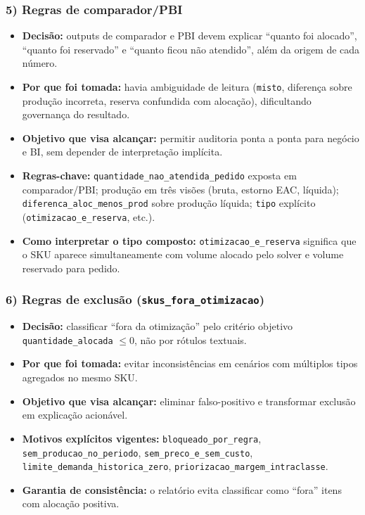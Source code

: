 \documentclass[11pt,a4paper]{article}
\begin{document}
\subsubsection*{5) Regras de comparador/PBI}
\begin{itemize}
    \item \textbf{Decisão:} outputs de comparador e PBI devem explicar ``quanto
    foi alocado'', ``quanto foi reservado'' e ``quanto ficou não atendido'',
    além da origem de cada número.
    \item \textbf{Por que foi tomada:} havia ambiguidade de leitura
    (\texttt{misto}, diferença sobre produção incorreta, reserva confundida com
    alocação), dificultando governança do resultado.
    \item \textbf{Objetivo que visa alcançar:} permitir auditoria ponta a ponta
    para negócio e BI, sem depender de interpretação implícita.
    \item \textbf{Regras-chave:}
    \texttt{quantidade\_nao\_atendida\_pedido} exposta em comparador/PBI;
    produção em três visões (bruta, estorno EAC, líquida);
    \texttt{diferenca\_aloc\_menos\_prod} sobre produção líquida;
    \texttt{tipo} explícito (\texttt{otimizacao\_e\_reserva}, etc.).
    \item \textbf{Como interpretar o tipo composto:}
    \texttt{otimizacao\_e\_reserva} significa que o SKU aparece simultaneamente
    com volume alocado pelo solver e volume reservado para pedido.
\end{itemize}

\subsubsection*{6) Regras de exclusão (\texttt{skus\_fora\_otimizacao})}
\begin{itemize}
    \item \textbf{Decisão:} classificar ``fora da otimização'' pelo critério
    objetivo \texttt{quantidade\_alocada} \(\le 0\), não por rótulos textuais.
    \item \textbf{Por que foi tomada:} evitar inconsistências em cenários com
    múltiplos tipos agregados no mesmo SKU.
    \item \textbf{Objetivo que visa alcançar:} eliminar falso-positivo e
    transformar exclusão em explicação acionável.
    \item \textbf{Motivos explícitos vigentes:}
    \texttt{bloqueado\_por\_regra},
    \texttt{sem\_producao\_no\_periodo},
    \texttt{sem\_preco\_e\_sem\_custo},
    \texttt{limite\_demanda\_historica\_zero},
    \texttt{priorizacao\_margem\_intraclasse}.
    \item \textbf{Garantia de consistência:} o relatório evita classificar
    como ``fora'' itens com alocação
    positiva.
\end{itemize}
\end{document}
